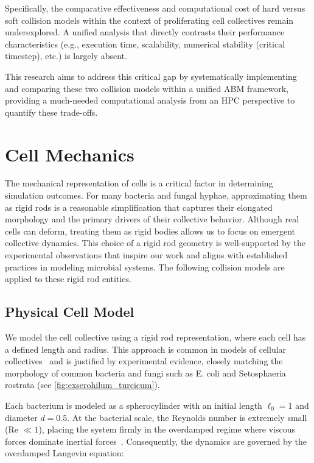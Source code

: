 \documentclass[conference]{IEEEtran}
\begin{document}
Specifically, the comparative effectiveness and computational cost of hard versus soft collision models within the context of proliferating cell collectives remain underexplored. A unified analysis that directly contrasts their performance characteristics (e.g., execution time, scalability, numerical stability (critical timestep), etc.) is largely absent.

This research aims to address this critical gap by systematically implementing and comparing these two collision models within a unified ABM framework, providing a much-needed computational analysis from an HPC perspective to quantify these trade-offs.

\section{Cell Mechanics}

The mechanical representation of cells is a critical factor in determining simulation outcomes. For many bacteria and fungal hyphae, approximating them as rigid rods is a reasonable simplification that captures their elongated morphology and the primary drivers of their collective behavior. Although real cells can deform, treating them as rigid bodies allows us to focus on emergent collective dynamics. This choice of a rigid rod geometry is well-supported by the experimental observations that inspire our work and aligns with established practices in modeling microbial systems. The following collision models are applied to these rigid rod entities.

\subsection{Physical Cell Model}

We model the cell collective using a rigid rod representation, where each cell has a defined length and radius. This approach is common in models of cellular collectives~\cite{You2018, Weady2024, Blanchard2015, Warren2019, Ghosh2015} and is justified by experimental evidence, closely matching the morphology of common bacteria and fungi such as E. coli and Setosphaeria rostrata (see \autoref{fig:exserohilum_turcicum}).

Each bacterium is modeled as a spherocylinder with an initial length $\ell_0 = 1$ and diameter $d = 0.5$. At the bacterial scale, the Reynolds number is extremely small (Re $\ll 1$), placing the system firmly in the overdamped regime where viscous forces dominate inertial forces~\cite{datta2024lifelowreynoldsnumber}. Consequently, the dynamics are governed by the overdamped Langevin equation:
\end{document}
